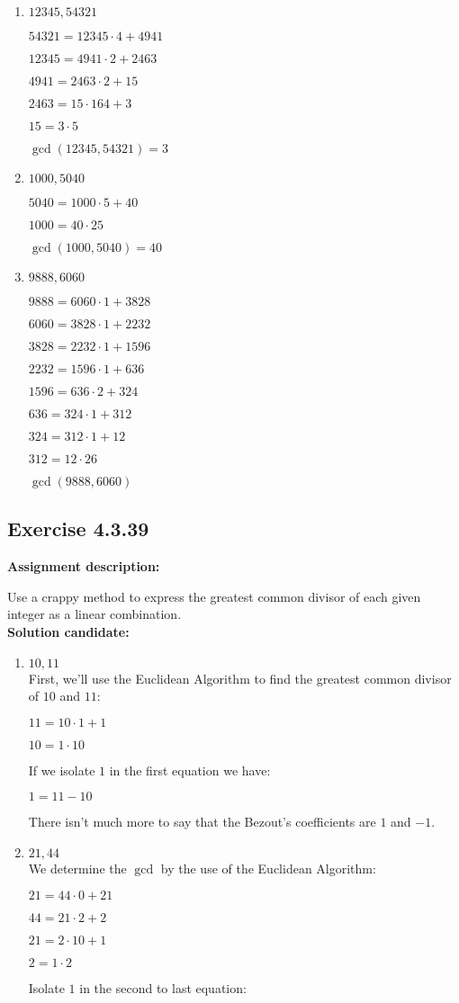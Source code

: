 \documentclass{report}
\newcommand{\cent}[1]{\begin{center}#1\end{center}}
\newcommand{\AssignmentDescription}{\textbf{Assignment description: }}
\newcommand{\Solution}{\textbf{Solution candidate: }}
\newcommand{\Exercise}[1]{\subsection{Exercise #1}}
\newcommand{\defaultEnumerateLabel}{\textbf{\alph*.}}
\newcommand{\MyItem}[1]{\item #1\\}
\begin{document}
\begin{enumerate}[label=\defaultEnumerateLabel]
\begin{enumerate}[label=\defaultEnumerateLabel]
		\MyItem{$12345, 54321$}
		
		\cent{$54321 = 12345 \cdot 4 + 4941$}
		\cent{$12345 = 4941 \cdot 2 + 2463$}
		\cent{$4941 = 2463 \cdot 2 + 15$}
		\cent{$2463 = 15 \cdot 164 + 3$}
		\cent{$15 = 3 \cdot 5$}
		
		\cent{$\gcd(12345,54321) = 3$}
		
		\MyItem{$1000,5040$}
		
		\cent{$5040 = 1000 \cdot 5 + 40$}
		\cent{$1000 = 40 \cdot 25$}
		
		\cent{$\gcd(1000,5040) = 40$}
		
		\MyItem{$9888, 6060$}
		
		\cent{$9888 = 6060 \cdot 1 + 3828$}
		\cent{$6060 = 3828 \cdot 1 + 2232$}
		\cent{$3828 =  2232 \cdot 1 + 1596$}
		\cent{$2232 =  1596 \cdot 1 + 636$}
		\cent{$1596  =  636 \cdot 2 + 324$}
		\cent{$636  =  324 \cdot 1 + 312$}
		\cent{$324   = 312 \cdot 1 + 12$}
		\cent{$312    = 12\cdot 26$}
		
		\cent{$\gcd(9888,6060)$}
		
	\end{enumerate}
	\Exercise{4.3.39}
	
	\AssignmentDescription
	
	Use a crappy method to express the greatest common divisor of each given integer as a linear combination.\\
	
	\Solution
	
	\begin{enumerate}[label=\defaultEnumerateLabel]
		\MyItem{$10,11$}
		
		First, we'll use the Euclidean Algorithm to find the greatest common divisor of $10$ and $11$:
		
		\cent{$11 = 10 \cdot 1 + 1$}
		\cent{$10 = 1 \cdot 10$}
		
		
		If we isolate $1$ in the first equation we have:
		
		\cent{$1 = 11 - 10 $}
		
		There isn't much more to say that the Bezout's coefficients are $1$ and $-1$.\\
		
		\MyItem{$21,44$}
		
		We determine the $\gcd$ by the use of the Euclidean Algorithm:
		
		\cent{$21 = 44\cdot 0 + 21$}
		\cent{$44 = 21 \cdot 2 + 2$}
		\cent{$21 = 2 \cdot 10 + 1$}
		\cent{$2 = 1 \cdot 2$}
		
		Isolate $1$ in the second to last equation:
		

\end{enumerate}
\end{enumerate}
\end{document}
